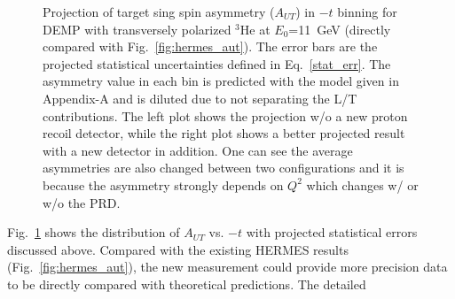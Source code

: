 \begin{figure}[!ht]
 \begin{center}
      \caption{\footnotesize{Projection of target sing spin asymmetry
          ($A_{UT}$) in $-t$ binning for DEMP with transversely polarized
          $\mathrm{^{3}He}$ at $E_{0}$=11~GeV (directly compared with Fig.~\ref{fig:hermes_aut}). The error bars are the projected
          statistical uncertainties defined in Eq.~\ref{stat_err}. The
          asymmetry value in each bin is predicted with the model given in Appendix-A and is diluted due to not separating the L/T
          contributions. The left plot shows the projection w/o a new proton
          recoil detector, while the right plot shows a better projected result
          with a new detector in addition. One can see the average asymmetries are also
          changed between two configurations and it is because the asymmetry
          strongly depends on $Q^{2}$ which changes w/ or w/o the PRD.}}
  \label{asym_t}
  \end{center}
\end{figure}
Fig.~\ref{asym_t} shows the distribution of $A_{UT}$ vs. $-t$ with projected
statistical errors discussed above. Compared with the existing HERMES results
(Fig.~\ref{fig:hermes_aut}), the new measurement could provide more precision
data to be directly compared with theoretical predictions. The detailed
